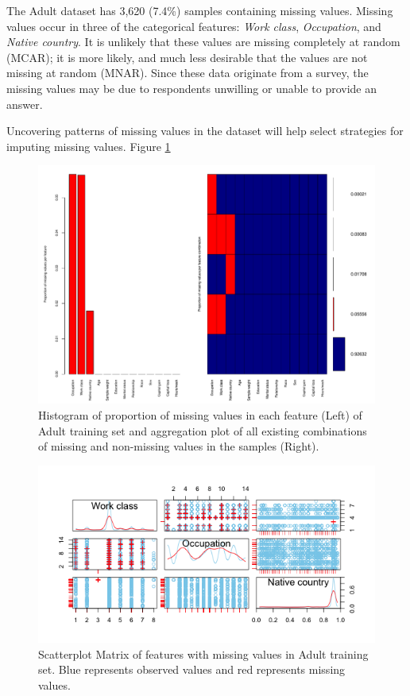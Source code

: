 \documentclass[12pt]{article}
\begin{document}
The Adult dataset has 3,620 (7.4\%) samples containing missing values. Missing values occur in three of the categorical features: \textit{Work class}, \textit{Occupation}, and \textit{Native country}. It is unlikely that these values are missing completely at random (MCAR); it is more likely, and much less desirable that the values are not missing at random (MNAR). Since these data originate from a survey, the missing values may be due to respondents unwilling or unable to provide an answer.  

Uncovering patterns of missing values in the dataset will help select strategies for imputing missing values. Figure \ref{proportion-missing}

\begin{figure}[htbp] 
   \centering
   \includegraphics[scale=0.6]{proportion-missing.pdf} 
   \caption{Histogram of proportion of missing values in each feature (Left) of Adult training set and aggregation plot of all existing combinations of missing and non-missing values in the samples (Right).}
   \label{proportion-missing}
\end{figure}

\begin{figure}[htbp] 
   \centering
   \includegraphics[scale=1]{scatter-matrix-missing.png} 
   \caption{Scatterplot Matrix of features with missing values in Adult training set. Blue represents observed values and red represents missing values.}
   \label{scatter-matrix-missing}
\end{figure}
\end{document}
